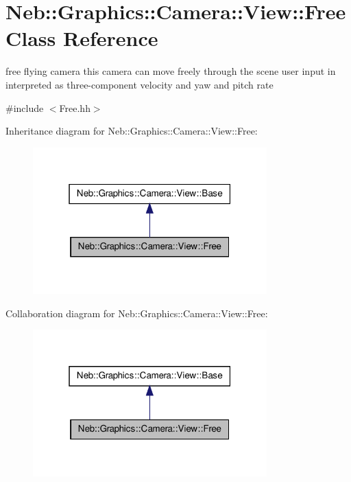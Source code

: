 \hypertarget{classNeb_1_1Graphics_1_1Camera_1_1View_1_1Free}{\section{\-Neb\-:\-:\-Graphics\-:\-:\-Camera\-:\-:\-View\-:\-:\-Free \-Class \-Reference}
\label{classNeb_1_1Graphics_1_1Camera_1_1View_1_1Free}
}


free flying camera this camera can move freely through the scene user input in interpreted as three-\/component velocity and yaw and pitch rate  




{\ttfamily \#include $<$\-Free.\-hh$>$}



\-Inheritance diagram for \-Neb\-:\-:\-Graphics\-:\-:\-Camera\-:\-:\-View\-:\-:\-Free\-:\nopagebreak
\begin{figure}[H]
\begin{center}
\leavevmode
\includegraphics[width=256pt]{classNeb_1_1Graphics_1_1Camera_1_1View_1_1Free__inherit__graph}
\end{center}
\end{figure}


\-Collaboration diagram for \-Neb\-:\-:\-Graphics\-:\-:\-Camera\-:\-:\-View\-:\-:\-Free\-:\nopagebreak
\begin{figure}[H]
\begin{center}
\leavevmode
\includegraphics[width=256pt]{classNeb_1_1Graphics_1_1Camera_1_1View_1_1Free__coll__graph}
\end{center}
\end{figure}
